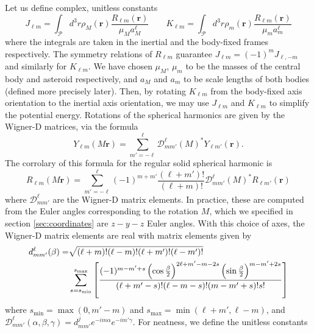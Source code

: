 \documentclass[11pt]{article}
\begin{document}
Let us define complex, unitless constants
\begin{equation}
J_{\ell m} = \int_\mathcal{P} d^3 r \rho_M(\bm r) \frac{R_{\ell m}(\bm r)}{\mu_M a_M^\ell}
\qquad
K_{\ell m} = \int_\mathcal{P} d^3 r \rho_m(\bm r) \frac{R_{\ell m}(\bm r)}{\mu_m a_m^\ell}
\label{eqn:jlm}
\end{equation}
where the integrals are taken in the inertial and the body-fixed frames respectively. The symmetry relations of $R_{\ell m}$ guarantee $J_{\ell m} = (-1)^m J_{\ell, -m}$ and similarly for $K_{\ell m}$. We have chosen $\mu_M$, $\mu_m$ to be the masses of the central body and asteroid respectively, and $a_M$ and $a_m$ to be scale lengths of both bodies (defined more precisely later). Then, by rotating $K_{\ell m}$ from the body-fixed axis orientation to the inertial axis orientation, we may use $J_{\ell m}$ and $K_{\ell m}$ to simplify the potential energy. Rotations of the spherical harmonics are given by the Wigner-D matrices, via the formula
\begin{equation}
Y_{\ell m}(M\bm r) = \sum_{m'=-\ell}^\ell \mathcal{D}^\ell_{mm'}(M)^* Y_{\ell m'}(\bm r).
\end{equation}
The corrolary of this formula for the regular solid spherical harmonic is
\begin{equation}
R_{\ell m} (M \bm r) = \sum_{m'=-\ell}^\ell (-1)^{m+m'} \frac{(\ell + m')!}{(\ell + m)!}\mathcal{D}^\ell_{mm'}(M)^* R_{\ell m'} (\bm r)
\end{equation}
where $\mathcal{D}^\ell_{mm'}$ are the Wigner-D matrix elements. In practice, these are computed from the Euler angles corresponding to the rotation $M$, which we specified in section \ref{sec:coordinates} are $z-y-z$ Euler angles. With this choice of axes, the Wigner-D matrix elements are real with matrix elements given by
\begin{equation}
\begin{aligned}
d^\ell_{mm'}(\beta) = &\sqrt{(\ell+m)!(\ell-m)!(\ell+m')!(\ell-m')!}\\
& \sum_{s=s_\text{min}}^{s_\text{max}} \left[ \frac{(-1)^{m-m'+s}\left( \cos\frac{\beta}{2} \right)^{2\ell + m' - m - 2s}\left( \sin \frac{\beta}{2} \right)^{m-m'+2s}}{(\ell+m'-s)!(\ell-m-s)!(m-m'+s)!s!} \right]
\end{aligned}
\label{eqn:wigner-d-elements}
\end{equation}
where $s_\text{min} = \max(0, m'-m)$ and $s_\text{max} = \min(\ell+m', \ell-m)$,
and $\mathcal{D}^\ell_{mm'}(\alpha, \beta, \gamma) = d^j_{mm'}e^{-im\alpha} e^{-im'\gamma}$. For neatness, we define the unitless constants
\end{document}
